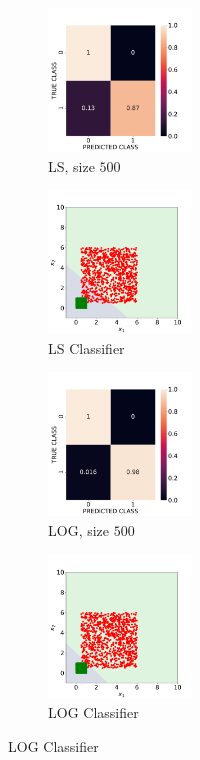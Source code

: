 \documentclass[12pt, a4 paper]{article}
\begin{document}
\begin{figure}[!htbp]
    \begin{subfigure}[!htbp]{0.2\textwidth}
       \centering
       \includegraphics[width=1.5in]{../results/ex1/acc_LS_dataset_Uniform_size_500.pdf}
       \caption{LS, size $500$}
       \label{fig:LS_P1a_500}
    \end{subfigure}
\quad
    \begin{subfigure}[!htbp]{0.2\textwidth}
       \centering
       \includegraphics[width=1.5in]{../results/ex1/samples_LS_dataset_Uniform_size_500.pdf}
       \caption{LS Classifier}
       \label{fig:LSD_P1a_500}
    \end{subfigure}
\quad
    \begin{subfigure}[!htbp]{0.2\textwidth}
       \centering
       \includegraphics[width=1.5in]{../results/ex1/acc_LOG_dataset_Uniform_size_500.pdf}
       \caption{LOG, size $500$}
       \label{fig:LOG_P1a_500}
    \end{subfigure}
\quad
    \begin{subfigure}[!htbp]{0.2\textwidth}
       \centering
       \includegraphics[width=1.5in]{../results/ex1/samples_LOG_dataset_Uniform_size_500.pdf}
       \caption{LOG Classifier}
       \label{fig:LOGD_P1a_500}
    \end{subfigure} 
    

\end{figure}
\end{document}
